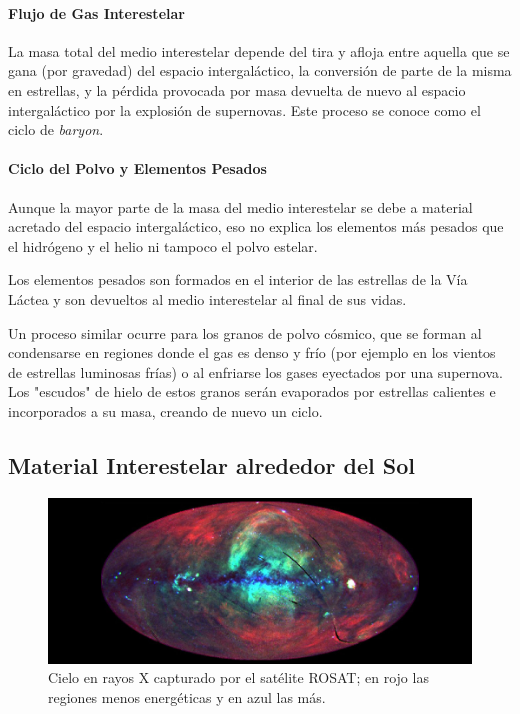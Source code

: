 \documentclass{tufte-handout}
\begin{document}
\paragraph{Flujo de Gas Interestelar}

La masa total del medio interestelar depende del tira y afloja entre aquella que se gana (por gravedad) del espacio intergaláctico, la conversión de parte de la misma en estrellas, y la pérdida provocada por masa devuelta de nuevo al espacio intergaláctico por la explosión de supernovas. Este proceso se conoce como el ciclo de \emph{baryon}.

\paragraph{Ciclo del Polvo y Elementos Pesados}

Aunque la mayor parte de la masa del medio interestelar se debe a material acretado del espacio intergaláctico, eso no explica los elementos más pesados que el hidrógeno y el helio ni tampoco el polvo estelar.

Los elementos pesados son formados en el interior de las estrellas de la Vía Láctea y son devueltos al medio interestelar al final de sus vidas.

Un proceso similar ocurre para los granos de polvo cósmico, que se forman al condensarse en regiones donde el gas es denso y frío (por ejemplo en los vientos de estrellas luminosas frías) o al enfriarse los gases eyectados por una supernova. Los "escudos" de hielo de estos granos serán evaporados por estrellas calientes e incorporados a su masa, creando de nuevo un ciclo.

\subsection{Material Interestelar alrededor del Sol}

\begin{figure}
  \includegraphics[width=\linewidth]{img/xray}
  \caption{Cielo en rayos X capturado por el satélite ROSAT; en rojo las regiones menos energéticas y en azul las más.}
\end{figure}
\end{document}
